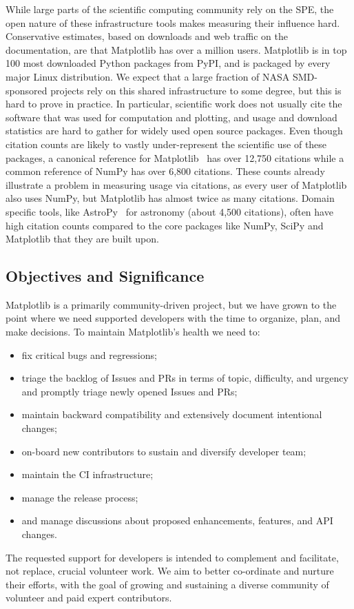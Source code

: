 \documentclass[12pt]{article}
\numberwithin{page}{section}
\begin{document}
While large parts of the scientific computing community rely on the
SPE, the open nature of these infrastructure tools makes measuring
their influence hard.  Conservative estimates, based on downloads and
web traffic on the documentation, are that Matplotlib has over a
million users.  Matplotlib is in top 100 most downloaded Python
packages from PyPI, and is packaged by every major Linux distribution.
We expect that a large fraction of NASA SMD-sponsored projects rely on
this shared infrastructure to some degree, but this is hard to prove
in practice.  In particular, scientific work does not usually cite the
software that was used for computation and plotting, and usage and
download statistics are hard to gather for widely used open source
packages.  Even though citation counts are likely to vastly
under-represent the scientific use of these packages, a canonical
reference for Matplotlib~\cite{Hunter:2007} has over 12,750 citations
while a common reference of NumPy\cite{walt2011numpy} has over 6,800
citations. These counts already illustrate a problem in measuring
usage via citations, as every user of Matplotlib also uses NumPy, but
Matplotlib has almost twice as many citations.  Domain specific tools,
like AstroPy~\cite{robitaille2013astropy} for astronomy (about 4,500
citations), often have high citation counts compared to the core
packages like NumPy, SciPy and Matplotlib that they are built upon.


\subsection{Objectives and Significance}


Matplotlib is a primarily community-driven project, but we have grown to the
point where we need supported developers with the time to organize, plan, and
make decisions.  To maintain Matplotlib's health we need to:
\begin{itemize}[noitemsep]
\item fix critical bugs and regressions;
\item triage the backlog of Issues and PRs in terms of topic,
  difficulty, and urgency and promptly triage newly opened Issues and
  PRs;
\item maintain backward compatibility and extensively document
  intentional changes;
\item on-board new contributors to sustain and diversify developer
  team;
\item maintain the CI infrastructure;
\item manage the release process;
\item and manage discussions about proposed enhancements, features,
  and API changes.
\end{itemize}
The requested support for developers is intended to complement and
facilitate, not replace, crucial volunteer work.  We aim to better
co-ordinate and nurture their efforts, with the goal of growing and
sustaining a diverse community of volunteer and paid expert
contributors.
\end{document}
